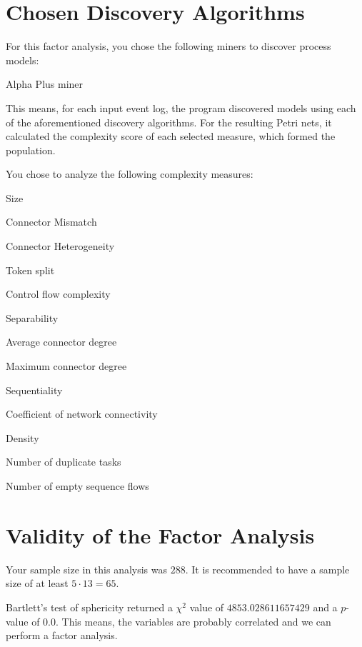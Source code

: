 \documentclass[a4paper]{article}
\begin{document}
\section*{Chosen Discovery Algorithms}
For this factor analysis, you chose the following miners to discover process models:
\begin{compactitem}
\item Alpha Plus miner
\end{compactitem}

This means, for each input event log, the program discovered models using each of the aforementioned discovery algorithms.
For the resulting Petri nets, it calculated the complexity score of each selected measure, which formed the population.

You chose to analyze the following complexity measures:
\begin{compactitem}
\item Size
\item Connector Mismatch
\item Connector Heterogeneity
\item Token split
\item Control flow complexity
\item Separability
\item Average connector degree
\item Maximum connector degree
\item Sequentiality
\item Coefficient of network connectivity
\item Density
\item Number of duplicate tasks
\item Number of empty sequence flows
\end{compactitem}

\section*{Validity of the Factor Analysis}
Your sample size in this analysis was $288$.
It is recommended to have a sample size of at least $5 \cdot 13 = 65$.

Bartlett's test of sphericity returned a $\chi^2$ value of $4853.028611657429$ and a $p$-value of $0.0$.
This means, the variables are probably correlated and we can perform a factor analysis.
\end{document}
